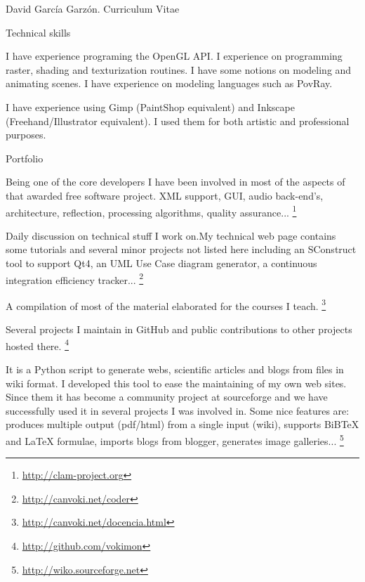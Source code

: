 \documentclass{article}
\begin{document}
\begin{cv}{David García Garzón. Curriculum Vitae}
\begin{cvlist}{Technical skills}
\item[3D Programming]
	I have experience programing the OpenGL API. I experience on programming raster, shading and texturization routines. I have some notions on modeling and animating scenes. I have experience on modeling languages such as PovRay. 

\item[2D Graphics]
	I have experience using Gimp (PaintShop equivalent) and Inkscape (Freehand/Illustrator equivalent). I used them for both artistic and professional purposes. 

\end{cvlist}

\begin{cvlist}{Portfolio}
\item[CLAM (C++ Library of Audio and Music)]
Being one of the core developers I have been involved in most of the aspects of that awarded free software project. XML support, GUI, audio back-end's, architecture, reflection, processing algorithms, quality assurance...
\footnote{\href{http://clam-project.org}{http://clam-project.org}}
\item[My technical blog and web page]
Daily discussion on technical stuff I work on.My technical web page contains some tutorials and several minor projects not listed here including an SConstruct tool to support Qt4, an UML Use Case diagram generator, a continuous integration efficiency tracker...
\footnote{\href{http://canvoki.net/coder}{http://canvoki.net/coder}}
\item[Course materials]
A compilation of most of the material elaborated for the courses I teach.
\footnote{\href{http://canvoki.net/docencia.html}{http://canvoki.net/docencia.html}}
\item[Personal GitHub page]
Several projects I maintain in GitHub and public contributions to other projects hosted there.
\footnote{\href{http://github.com/vokimon}{http://github.com/vokimon}}
\item[WiKo (The wiki compiler)]
It is a Python script to generate webs, scientific articles and blogs from files in wiki format. I developed this tool to ease the maintaining of my own web sites. Since them it has become a community project at sourceforge and we have successfully used it in several projects I was involved in. Some nice features are: produces multiple output (pdf/html) from a single input (wiki), supports BiBTeX and LaTeX formulae, imports blogs from blogger, generates image galleries... 
\footnote{\href{http://wiko.sourceforge.net}{http://wiko.sourceforge.net}}

\end{cvlist}
\end{cv}
\end{document}
